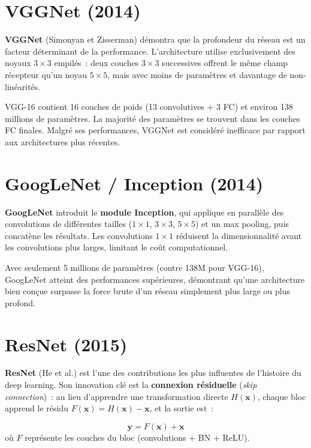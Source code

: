 \documentclass[a4paper,11pt,twoside]{book}
\newcommand{\vect}[1]{\boldsymbol{#1}}
\begin{document}
\section{VGGNet (2014)}

\textbf{VGGNet} (Simonyan et Zisserman) démontra que la profondeur du réseau est un facteur déterminant de la performance. L'architecture utilise exclusivement des noyaux $3 \times 3$ empilés~: deux couches $3 \times 3$ successives offrent le même champ récepteur qu'un noyau $5 \times 5$, mais avec moins de paramètres et davantage de non-linéarités.

VGG-16 contient 16 couches de poids (13 convolutives + 3 FC) et environ 138 millions de paramètres. La majorité des paramètres se trouvent dans les couches FC finales. Malgré ses performances, VGGNet est considéré inefficace par rapport aux architectures plus récentes.

\section{GoogLeNet / Inception (2014)}

\textbf{GoogLeNet} introduit le \textbf{module Inception}, qui applique en parallèle des convolutions de différentes tailles ($1 \times 1$, $3 \times 3$, $5 \times 5$) et un max pooling, puis concatène les résultats. Les convolutions $1 \times 1$ réduisent la dimensionnalité avant les convolutions plus larges, limitant le coût computationnel.

Avec seulement 5 millions de paramètres (contre 138M pour VGG-16), GoogLeNet atteint des performances supérieures, démontrant qu'une architecture bien conçue surpasse la force brute d'un réseau simplement plus large ou plus profond.

\section{ResNet (2015)}

\textbf{ResNet} (He et al.) est l'une des contributions les plus influentes de l'histoire du deep learning. Son innovation clé est la \textbf{connexion résiduelle} (\textit{skip connection})~: au lieu d'apprendre une transformation directe $H(\vect{x})$, chaque bloc apprend le résidu $F(\vect{x}) = H(\vect{x}) - \vect{x}$, et la sortie est~:

\begin{defbox}
\[
\vect{y} = F(\vect{x}) + \vect{x}
\]
où $F$ représente les couches du bloc (convolutions + BN + ReLU).
\end{defbox}
\end{document}
